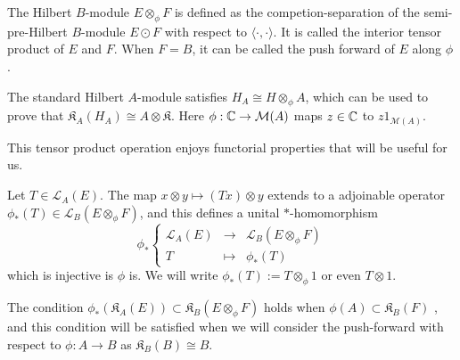 \begin{definition}
The Hilbert $B$-module $E\otimes_\phi F$ is defined as the competion-separation of the semi-pre-Hilbert $B$-module $E\odot F$ with respect to $\langle \cdot , \cdot \rangle$. It is called the interior tensor product of $E$ and $F$. When $F=B$, it can be called the push forward of $E$ along $\phi$.
\end{definition} 

\begin{Expl}
The standard Hilbert $A$-module satisfies $H_A \cong H\otimes_\phi A$, which can be used to prove that $\mathfrak K_A(H_A) \cong A\otimes \mathfrak K$. Here $\phi : \mathbb C\rightarrow \mathcal M(A)$ maps $z\in \mathbb C$ to $z1_{\mathcal M(A)}$.
\end{Expl}

This tensor product operation enjoys functorial properties that will be useful for us. 

\begin{prop}\cite{Lance}
Let $T\in\mathcal L_A(E)$. The map $x\otimes y \mapsto (Tx)\otimes y$ extends to a adjoinable operator $\phi_*(T)\in\mathcal L_B(E\otimes_\phi F)$, and this defines a unital $*$-homomorphism 
\[\phi_*\left\{\begin{array}{rcl} \mathcal L_A(E) & \rightarrow & \mathcal L_B(E\otimes_\phi F) \\ T & \mapsto & \phi_*(T)\end{array}\right.\]
which is injective is $\phi$ is. We will write $\phi_*(T) := T\otimes_\phi 1$ or even $T\otimes 1$. 
\end{prop} 

\begin{rk}
The condition $\phi_*(\mathfrak K_A(E))\subset \mathfrak K_B(E\otimes_\phi F)$ holds when $\phi(A)\subset \mathfrak K_B(F)$ \cite{Lance}, and this condition will be satisfied when we will consider the push-forward with respect to $\phi : A\rightarrow B$ as $\mathfrak K_B(B) \cong B$. 
\end{rk}

